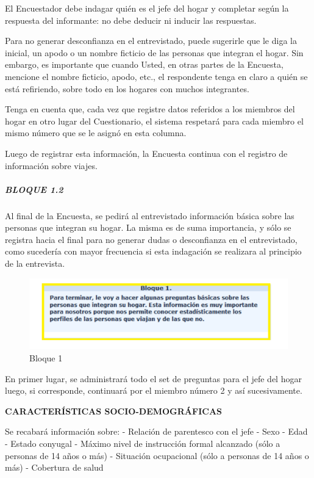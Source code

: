 \documentclass[
  openany]{book}
\begin{document}
El Encuestador debe indagar quién es el jefe del hogar y completar según la respuesta del informante: no debe deducir ni inducir las respuestas.

Para no generar desconfianza en el entrevistado, puede sugerirle que le diga la inicial, un apodo o un nombre ficticio de las personas que integran el hogar. Sin embargo, es importante que cuando Usted, en otras partes de la Encuesta, mencione el nombre ficticio, apodo, etc., el respondente tenga en claro a quién se está refiriendo, sobre todo en los hogares con muchos integrantes.

Tenga en cuenta que, cada vez que registre datos referidos a los miembros del hogar en otro lugar del Cuestionario, el sistema respetará para cada miembro el mismo número que se le asignó en esta columna.

Luego de registrar esta información, la Encuesta continua con el registro de información sobre viajes.

\hypertarget{bloque-1.2}{%
\subparagraph{\texorpdfstring{\textbf{BLOQUE 1.2}}{BLOQUE 1.2}}\label{bloque-1.2}}

Al final de la Encuesta, se pedirá al entrevistado información básica sobre las personas que integran su hogar. La misma es de suma importancia, y sólo se registra hacia el final para no generar dudas o desconfianza en el entrevistado, como sucedería con mayor frecuencia si esta indagación se realizara al principio de la entrevista.

\begin{figure}

{\centering \includegraphics[width=1\linewidth]{imagenes/figura6-49} 

}

\caption{Bloque 1}\label{fig:bloque1}
\end{figure}

En primer lugar, se administrará todo el set de preguntas para el jefe del hogar luego, si corresponde, continuará por el miembro número 2 y así sucesivamente.

\textbf{CARACTERÍSTICAS SOCIO-DEMOGRÁFICAS}

Se recabará información sobre: - Relación de parentesco con el jefe - Sexo - Edad - Estado conyugal - Máximo nivel de instrucción formal alcanzado (sólo a personas de 14 años o más) - Situación ocupacional (sólo a personas de 14 años o más) - Cobertura de salud
\end{document}
